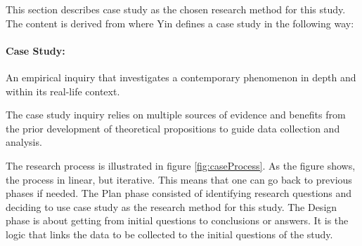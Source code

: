 This section describes case study as the chosen research method for this study. The content is derived from \cite{CaseStudyResearch} where Yin defines a case study in the following way:

\paragraph{Case Study:} An empirical inquiry that investigates a contemporary phenomenon in depth and within its real-life context.


The case study inquiry relies on multiple sources of evidence and benefits from the prior development of theoretical propositions to guide data collection and analysis.

The research process is illustrated in figure \ref{fig:caseProcess}. As the figure shows, the process in linear, but iterative. This means that one can go back to previous phases if needed. The Plan phase consisted of identifying research questions and deciding to use case study as the research method for this study. The Design phase is about getting from initial questions to conclusions or answers. It is the logic that links the data to be collected to the initial questions of the study. 

